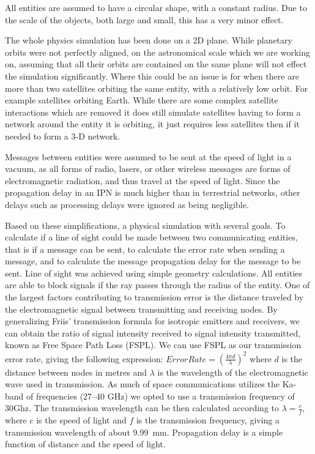 \documentclass[a4paper,12pt]{article}
\begin{document}
All entities are assumed to have a circular shape, with a constant radius. Due
to the scale of the objects, both large and small, this has a very minor effect.

The whole physics simulation has been done on a 2D plane. While planetary orbits
were not perfectly aligned, on the astronomical scale which we are working on,
assuming that all their orbits are contained on the same plane will not effect
the simulation significantly. Where this could be an issue is for when there are
more than two satellites orbiting the same entity, with a relatively low orbit.
For example satellites orbiting Earth. While there are some complex satellite
interactions which are removed it does still simulate satellites having to form
a network around the entity it is orbiting, it just requires less satellites
then if it needed to form a 3-D network.

Messages between entities were assumed to be sent at the speed of light in a
vacuum, as all forms of radio, lasers, or other wireless messages are forms of
electromagnetic radiation, and thus travel at the speed of light. Since the
propagation delay in an IPN is much higher than in terrestrial networks, other
delays such as processing delays were ignored as being negligible.

Based on these simplifications, a physical simulation with several goals. To
calculate if a line of sight could be made between two communicating entities,
that is if a message can be sent, to calculate the error rate when sending a
message, and to calculate the message propagation delay for the message to be
sent. Line of sight was achieved using simple geometry calculations.
All entities are able to block signals if the ray passes through the
radius of the entity. One of the largest factors contributing to transmission
error is the distance traveled by the electromagnetic signal between
transmitting and receiving nodes. By generalizing Friis' transmission
formula\cite{Friis} for isotropic emitters and receivers, we can obtain the
ratio of signal intensity received to signal intensity transmitted, known as
Free Space Path Loss (FSPL). We can use FSPL as our transmission error rate,
giving the following expression: $Error Rate = {(\frac{4 \pi d}{\lambda})}^2$
where $d$ is the distance between nodes in metres and $\lambda$ is the
wavelength of the electromagnetic wave used in transmission. As much of space
communications utilizes the Ka-band of frequencies (27--40
GHz)\cite{Morabito_Hastrup} we opted to use a transmission frequency of 30Ghz.
The transmission wavelength can be then calculated according to
$\lambda = \frac{c}{f}$, where $c$ is the speed of light and $f$ is the
transmission frequency, giving a transmission wavelength of about 9.99~mm.
Propagation delay is a simple function of distance and the speed of light.
\end{document}
